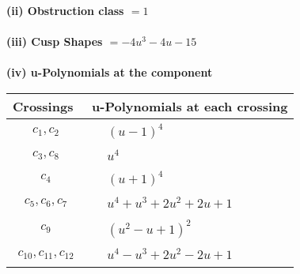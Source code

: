 \documentclass[1p]{elsarticle_modified}
\theoremstyle{definition}
\begin{document}
\flushleft \textbf{(ii) Obstruction class $= 1$}\\~\\
\flushleft \textbf{(iii) Cusp Shapes $= -4 u^3-4 u-15$}\\~\\
\newpage\renewcommand{\arraystretch}{1}
\flushleft \textbf{(iv) u-Polynomials at the component}\newline \\
\begin{tabular}{m{50pt}|m{274pt}}
Crossings & \hspace{64pt}u-Polynomials at each crossing \\
\hline $$\begin{aligned}c_{1},c_{2}\end{aligned}$$&$\begin{aligned}
&(u-1)^4
\end{aligned}$\\
\hline $$\begin{aligned}c_{3},c_{8}\end{aligned}$$&$\begin{aligned}
&u^4
\end{aligned}$\\
\hline $$\begin{aligned}c_{4}\end{aligned}$$&$\begin{aligned}
&(u+1)^4
\end{aligned}$\\
\hline $$\begin{aligned}c_{5},c_{6},c_{7}\end{aligned}$$&$\begin{aligned}
&u^4+u^3+2 u^2+2 u+1
\end{aligned}$\\
\hline $$\begin{aligned}c_{9}\end{aligned}$$&$\begin{aligned}
&(u^2- u+1)^2
\end{aligned}$\\
\hline $$\begin{aligned}c_{10},c_{11},c_{12}\end{aligned}$$&$\begin{aligned}
&u^4- u^3+2 u^2-2 u+1
\end{aligned}$\\
\hline
\end{tabular}\\~\\
\end{document}
